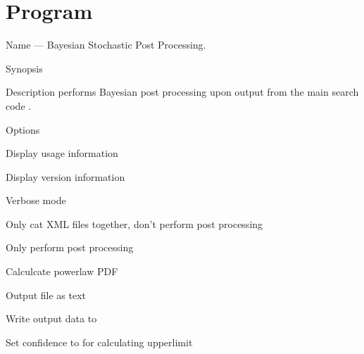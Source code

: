 
\section{Program }
\label{program:lalapps-stopp-bayes}

\begin{entry}
\item[Name]
 --- Bayesian Stochastic Post Processing.

\item[Synopsis]
  \newline \hspace*{0.5in}
 \newline \hspace*{0.5in}
 \newline \hspace*{0.5in}
 \newline \hspace*{0.5in}
 \newline \hspace*{0.5in}
 \newline \hspace*{0.5in}
 \newline \hspace*{0.5in}
 \newline \hspace*{0.5in}
  \newline \hspace*{0.5in}
 

\item[Description]
 performs Bayesian post processing upon output
from the main search code .

\item[Options]\leavevmode
\begin{entry}
\item[\option{--help}]
Display usage information
\item[\option{--version}]
Display version information
\item[\option{--verbose}]
Verbose mode
\item[\option{--cat-only}]
Only cat XML files together, don't perform post processing
\item[\option{--analyse-only}]
Only perform post processing
\item[\option{--powerlaw-pdf}]
Calculcate powerlaw PDF
\item[\option{--text}]
Output file as text
\item[\option{--output} \parm{FILE}]
Write output data to 
\item[\option{--confidence} \parm{LEVEL}]
Set confidence to  for calculating upperlimit
\end{entry}


\end{entry}
